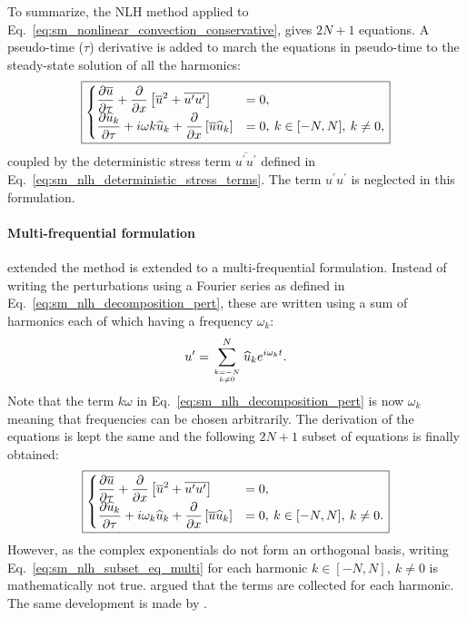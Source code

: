 To summarize, the NLH
method applied to Eq.~\ref{eq:sm_nonlinear_convection_conservative},
gives $2N + 1$ equations. A pseudo-time ($\tau$) derivative is
added to march the equations in pseudo-time to the steady-state 
solution of all the harmonics:
\begin{equation}
	\fbox{$
	\begin{cases}
		\displaystyle \frac{\partial \overline{u}}{\partial \tau} + 
		\frac{\partial}{\partial x}
			\left[\overline{u}^2 + 
			\overline{u^\prime u^\prime}\right] &=
			0, \\
		\displaystyle \frac{\partial \widehat{u}_k}{\partial \tau} + 
		i \omega k \widehat{u}_k + 
			\frac{\partial}{\partial x} 
			\left[ \overline{u} \widehat{u}_k\right] &= 
			0, \: k \in [-N, N], \: k \neq 0,
	\end{cases}
	$}
	\label{eq:sm_nlh_subset_eq}
\end{equation}
coupled by the deterministic stress term $\overline{u^\prime u^\prime}$
defined in Eq.~\ref{eq:sm_nlh_deterministic_stress_terms}.
The term $u^\prime u^\prime$ is neglected in this formulation.

\paragraph{Multi-frequential formulation}

\citet{He2002} extended the method is extended to a multi-frequential
formulation. Instead of writing the perturbations
using a Fourier series as defined in Eq.~\ref{eq:sm_nlh_decomposition_pert},
these are written using a sum of harmonics each of which
having a frequency $\omega_k$:
\begin{equation}
	u^\prime = \sum_{k=-N \atop k \neq 0}^{N} 
	\widehat{u}_k e^{i \omega_k t}.
	\label{eq:sm_nlh_decomposition_pert_multi}
\end{equation}
Note that the term $k \omega$ in Eq.~\ref{eq:sm_nlh_decomposition_pert}
is now $\omega_k$ meaning that frequencies can be chosen
arbitrarily.
The derivation of the equations is kept the same and the following
$2N+1$ subset of equations is finally obtained:
\begin{equation}
	\fbox{$
	\begin{cases}
		\displaystyle
		\frac{\partial \overline{u}}{\partial \tau} +
		\frac{\partial}{\partial x}
			\left[\overline{u}^2 + 
			\overline{u^\prime u^\prime}\right] &=
			0, \\
		\displaystyle
		\frac{\partial \widehat{u}_k}{\partial \tau} + 
		i \omega_k \widehat{u}_k + 
			\frac{\partial}{\partial x} 
			\left[ \overline{u} \widehat{u}_k\right] &= 
			0, \: k \in [-N, N], \: k \neq 0.
	\end{cases}
	$}
	\label{eq:sm_nlh_subset_eq_multi}
\end{equation}
However, as the complex exponentials do not form
an orthogonal basis, writing Eq.~\ref{eq:sm_nlh_subset_eq_multi}
for each harmonic $k \in [-N, N], \: k \neq 0$ is mathematically
not true. \citet{He2002} argued that the terms
are collected for each harmonic. 
The same development is made by \citet{Vilmin2006}.

